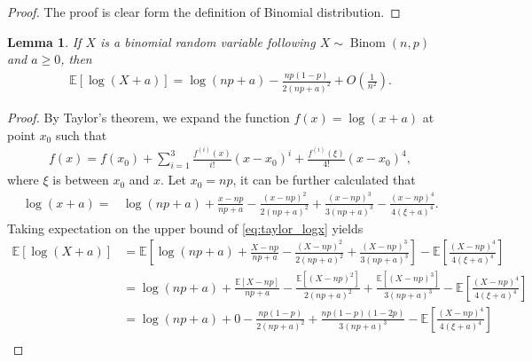 \documentclass[onecolumn,romanappendices,10pt]{IEEEtran}
\newtheorem{lemma}{Lemma}
\newcommand{\EE}{{\mathbb{E}}}
\DeclareMathOperator{\Binomial}{Binom}
\begin{document}
	\begin{proof}
		The proof is clear form the definition of Binomial distribution.
	\end{proof}
	
	\begin{lemma} \label{lem:exp_bin_logx}
		If $X$ is a binomial random variable following $X \sim \Binomial(n, p)$ and $a \geq 0$, then
		\begin{equation}
			\begin{aligned}
				\EE \left[ \log (X + a) \right] = \log (np + a) - \frac{np (1 - p)}{2 (np + a)^2} + O\left( \frac{1}{n^2} \right).
			\end{aligned}
		\end{equation}
	\end{lemma}
	
	\begin{proof}
		By Taylor's theorem, we expand the function $f(x) = \log (x + a)$ at point $x_0$ such that
		\begin{equation}
			\begin{aligned}
				f(x) = f(x_0) + \sum_{i=1}^{3} \frac{f^{(i)}(x)}{i !} (x - x_0)^i + \frac{f^{(i)}(\xi)}{4 !} (x - x_0)^4,
			\end{aligned}
		\end{equation}
		where $\xi$ is between $x_0$ and $x$. Let $x_0 = np$, it can be further calculated that
		\begin{equation}
			\begin{aligned}
				\log (x + a) =& \log (np + a) + \frac{x - np}{np + a} - \frac{(x - np)^2}{2 (np + a)^2} + \frac{(x - np)^3}{3 (np + a)^3} - \frac{(x - np)^4}{4 (\xi + a)^4}.
			\end{aligned}
			\label{eq:taylor_logx}
		\end{equation}
		Taking expectation on the upper bound of \eqref{eq:taylor_logx} yields
		\begin{equation}
			\begin{aligned}
				\EE \left[ \log (X + a) \right] &= \EE \left[ \log (np + a) + \frac{X - np}{np + a} - \frac{(X - np)^2}{2 (np + a)^2} + \frac{(X - np)^3}{3 (np + a)^3} \right] - \EE \left[ \frac{(X - np)^4}{4 (\xi + a)^4} \right] \\
				&= \log (np + a) + \frac{\EE \left[ X - np \right]}{np + a} - \frac{\EE \left[ (X - np)^2 \right]}{2 (np + a)^2} + \frac{\EE \left[ (X - np)^3 \right]}{3 (np + a)^3} - \EE \left[ \frac{(X - np)^4}{4 (\xi + a)^4} \right] \\
				&= \log (np + a) + 0 - \frac{np (1 - p)}{2 (np + a)^2} + \frac{np (1 - p) (1 - 2p)}{3 (np + a)^3} - \EE \left[ \frac{(X - np)^4}{4 (\xi + a)^4} \right] \\

\end{aligned}
\end{equation}
\end{proof}
\end{document}

